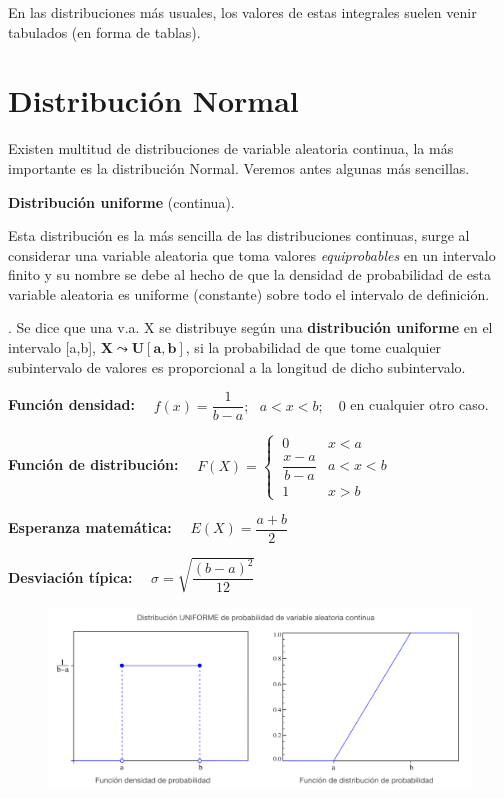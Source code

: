 En las distribuciones más usuales, los valores de estas integrales suelen venir tabulados (en forma de tablas).


\section{Distribución Normal}

Existen multitud de distribuciones de variable aleatoria continua, la más importante es la distribución Normal. Veremos antes algunas más sencillas.


\textbf{\large{Distribución uniforme}} \normalsize{(continua)}.

Esta distribución es la más sencilla de las distribuciones continuas, surge al considerar una variable aleatoria que toma valores \emph{equiprobables} en un intervalo finito y su nombre se debe al hecho de que la densidad de probabilidad de esta variable aleatoria es uniforme (constante) sobre todo el intervalo de definición.

\vspace{4mm}
\begin{definition}
.	Se dice que una v.a. X se distribuye según una \textbf{distribución uniforme} en el intervalo [a,b], $\boldsymbol{X \leadsto U[a,b]}$, si la probabilidad de que tome cualquier subintervalo de valores es proporcional a la longitud de dicho subintervalo.

\vspace{2mm} \textbf{Función densidad:} $\quad f(x)=\dfrac 1 {b-a}; \ \ \  a<x<b; \quad 0$ en cualquier otro caso.

\vspace{2mm} \textbf{Función de distribución:} $\quad F(X)=\begin{cases}
\ 0& x<a \\ \ \dfrac{x-a}{b-a} & a < x < b \\ \ 1 & x>b	
\end{cases}$

\vspace{2mm} \textbf{Esperanza matemática:} $\quad E(X)=\dfrac{a+b}2$

\vspace{2mm} \textbf{Desviación típica:} $\quad \sigma= \sqrt{\dfrac{(b-a)^2}{12}}$

	\begin{figure}[H]
	\centering
	\includegraphics[width=.9\textwidth]{imagenes/imagenes04/T04IM42.png}
	\end{figure}
\end{definition}

